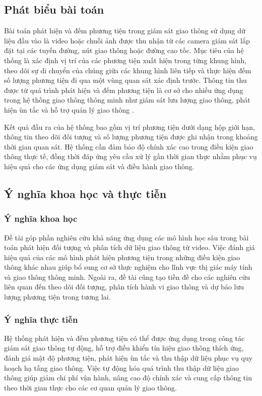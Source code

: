 \subsection{Phát biểu bài toán}

Bài toán phát hiện và đếm phương tiện trong giám sát giao thông sử dụng dữ liệu
đầu vào là video hoặc chuỗi ảnh được thu nhận từ các camera giám sát lắp đặt
tại các tuyến đường, nút giao thông hoặc đường cao tốc. Mục tiêu của hệ thống
là xác định vị trí của các phương tiện xuất hiện trong từng khung hình, theo dõi
sự di chuyển của chúng giữa các khung hình liên tiếp và thực hiện đếm số lượng
phương tiện đi qua một vùng quan sát xác định trước. Thông tin thu được từ quá
trình phát hiện và đếm phương tiện là cơ sở cho nhiều ứng dụng trong hệ thống
giao thông thông minh như giám sát lưu lượng giao thông, phát hiện ùn tắc và hỗ
trợ quản lý giao thông \cite{YANG2018143}.

Kết quả đầu ra của hệ thống bao gồm vị trí phương tiện dưới dạng hộp giới hạn,
thông tin theo dõi đối tượng và số lượng phương tiện được ghi nhận trong khoảng
thời gian quan sát. Hệ thống cần đảm bảo độ chính xác cao trong điều kiện giao
thông thực tế, đồng thời đáp ứng yêu cầu xử lý gần thời gian thực nhằm phục vụ
hiệu quả cho các ứng dụng giám sát và điều hành giao thông.
\subsection{Ý nghĩa khoa học và thực tiễn}

\subsubsection{Ý nghĩa khoa học}

Đề tài góp phần nghiên cứu khả năng ứng dụng các mô hình học sâu trong bài toán
phát hiện đối tượng và phân tích dữ liệu giao thông từ video. Việc đánh giá
hiệu quả của các mô hình phát hiện phương tiện trong những điều kiện giao thông
khác nhau giúp bổ sung cơ sở thực nghiệm cho lĩnh vực thị giác máy tính và giao
thông thông minh. Ngoài ra, đề tài cũng tạo tiền đề cho các nghiên cứu liên
quan đến theo dõi đối tượng, phân tích hành vi giao thông và dự báo lưu lượng
phương tiện trong tương lai.

\subsubsection{Ý nghĩa thực tiễn}

Hệ thống phát hiện và đếm phương tiện có thể được ứng dụng trong công tác giám
sát giao thông tự động, hỗ trợ điều khiển tín hiệu giao thông thích ứng, đánh
giá mật độ phương tiện, phát hiện ùn tắc và thu thập dữ liệu phục vụ quy hoạch
hạ tầng giao thông. Việc tự động hóa quá trình thu thập dữ liệu giao thông giúp
giảm chi phí vận hành, nâng cao độ chính xác và cung cấp thông tin theo thời
gian thực cho các cơ quan quản lý giao thông.


